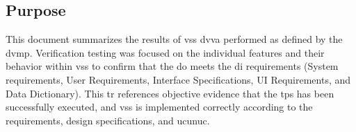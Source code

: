 \subsection{Purpose}
This document summarizes the results of \gls{vss} \gls{dvva} performed as
defined by the \gls{dvmp}. Verification testing was focused on the individual
features and their behavior within \gls{vss} to confirm that the \gls{do} 
meets the \gls{di} requirements (System requirements, User Requirements,
Interface Specifications, UI Requirements, and Data Dictionary). This \gls{tr}
references objective evidence that the \glspl{tp} has been successfully executed,
and \gls{vss} is implemented correctly according to the requirements, design
specifications, and \gls{ucunuc}.